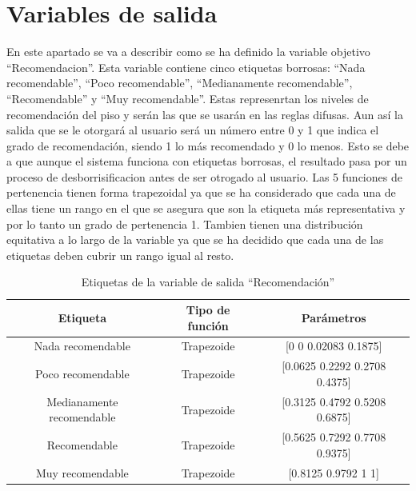 \documentclass[12pt]{report} %
\begin{document}
    \section{Variables de salida}
    En este apartado se va a describir como se ha definido la variable objetivo
    ``Recomendacion''. Esta variable contiene cinco etiquetas borrosas: ``Nada
    recomendable'', ``Poco recomendable'', ``Medianamente recomendable'',
    ``Recomendable'' y ``Muy recomendable''. Estas represenrtan los niveles de
    recomendación del piso y serán las que se usarán en las reglas difusas. Aun
    así la salida que se le otorgará al usuario será un número entre 0 y 1 que
    indica el grado de recomendación, siendo 1 lo más recomendado y 0 lo menos.
    Esto se debe a que aunque el sistema funciona con etiquetas borrosas, el
    resultado pasa por un proceso de desborrisificacion antes de ser otrogado al
    usuario. Las 5 funciones de pertenencia tienen forma trapezoidal ya que se
    ha considerado que cada una de ellas tiene un rango en el que se asegura que
    son la etiqueta más representativa y por lo tanto un grado de pertenencia 1.
    Tambien tienen una distribución equitativa a lo largo de la variable ya que
    se ha decidido que cada una de las etiquetas deben cubrir un rango igual al
    resto.

    \begin{table}[h]
        \center
        \begin{tabular}{@{}ccc@{}}
            \toprule
            \textbf{Etiqueta} & \textbf{Tipo de función} & \textbf{Parámetros} \\
            \midrule
            Nada recomendable         & Trapezoide & [0 0 0.02083 0.1875] \\
            Poco recomendable         & Trapezoide & [0.0625 0.2292 0.2708 0.4375] \\
            Medianamente recomendable & Trapezoide & [0.3125 0.4792 0.5208 0.6875] \\
            Recomendable              & Trapezoide & [0.5625 0.7292 0.7708 0.9375] \\
            Muy recomendable          & Trapezoide & [0.8125 0.9792 1 1]   \\
            \bottomrule
        \end{tabular}
        \caption{Etiquetas de la variable de salida ``Recomendación''}
    \end{table}
\end{document}
